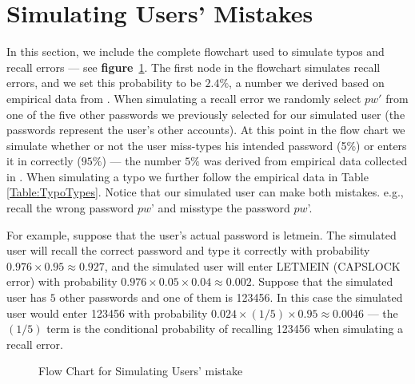 \section{Simulating Users' Mistakes}\label{appendix:simulateMistakes}
\vspace*{-\baselineskip}
In this section, we include the complete flowchart used to simulate typos and recall errors --- see \textbf{figure}~\ref{figure:flowChartTypo}. The first node in the flowchart simulates recall errors, and we set this probability to be $2.4\%$, a number we derived based on empirical data from \cite{CCS:CWPCR17,SP:CAAJR16}. When simulating a recall error we randomly select $pw'$ from one of the five other passwords we previously selected for our simulated user (the passwords represent the user's other accounts). At this point in the flow chart we simulate whether or not the user miss-types his intended password (5\%) or enters it in correctly ($95\%$) --- the number $5\%$ was derived from empirical data collected in \cite{CCS:CWPCR17,SP:CAAJR16}. When simulating a typo we further follow the empirical data in Table \ref{Table:TypoTypes}. Notice that our simulated user can make both mistakes. e.g., recall the wrong password $pw$' and misstype the password $pw$'. 

For example, suppose that the user's actual password is letmein. The simulated user will recall the correct password and type it correctly with probability $0.976 \times 0.95 \approx 0.927$, and the simulated user will enter LETMEIN (CAPSLOCK error) with probability $0.976 \times 0.05 \times 0.04 \approx 0.002$. Suppose that the simulated user has $5$ other passwords and one of them is 123456. In this case the simulated user would enter 123456 with probability $0.024 \times (1/5) \times 0.95 \approx 0.0046$ --- the $(1/5)$ term is the conditional probability of recalling 123456 when simulating a recall error.


\begin{figure}
	
	\vspace{-0.2in}
	\caption{Flow Chart for Simulating Users' mistake}\label{figure:flowChartTypo}
\end{figure}


